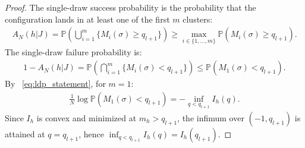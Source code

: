 \documentclass{article}
\theoremstyle{remark} %
\begin{document}
\begin{proof}
The single-draw success probability is the probability that the configuration lands in at least one of the first $m$ clusters:
\begin{align}
A_N(h \vert J)=\mathbb P\left(\bigcup_{i=1}^m \{M_i(\sigma)\ge q_{l+1}\}\right) \geq \max_{i \in \{1, \ldots, m\}} \mathbb P(M_i(\sigma)\ge q_{l+1}).
\end{align}
The single-draw failure probability is:
\begin{align}
1-A_N(h \vert J)=\mathbb P\left(\bigcap_{i=1}^m \{M_i(\sigma)< q_{l+1}\}\right) \leq \mathbb P(M_1(\sigma)<q_{l+1}).
\end{align}
By ~\eqref{eq:ldp_statement}, for $m=1$:
\begin{align}
\frac{1}{N}\log\mathbb P(M_1(\sigma)<q_{l+1})
=- \inf_{q<q_{l+1}} I_{h}(q).
\end{align}
Since $I_{h}$ is convex and minimized at $m_{h}>q_{l+1}$, the infimum over $(-1,q_{l+1})$ is attained at $q=q_{l+1}$,
hence $\inf_{q<q_{l+1}} I_{h}(q)=I_{h}(q_{l+1})$.


\end{proof}
\end{document}
